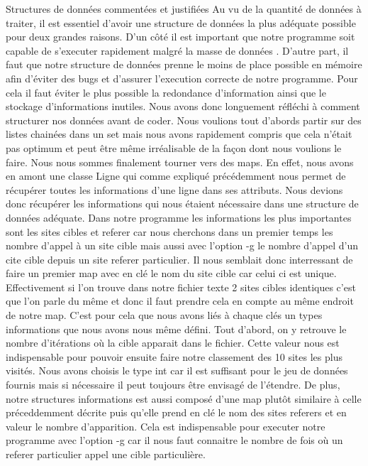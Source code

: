 \documentclass{article}
\begin{document}
\begin{section}{Structures de données commentées et justifiées}
Au vu de la quantité de données à traiter, il est essentiel d'avoir une structure de données la plus adéquate possible pour deux grandes raisons. D'un côté il est important que notre programme soit capable de s'executer rapidement malgré la masse de données . D'autre part, il faut que notre structure de données prenne le moins de place possible en mémoire afin d'éviter des bugs et d'assurer l'execution correcte de notre programme. Pour cela il faut éviter le plus possible la redondance d'information ainsi que le stockage d'informations inutiles.
Nous avons donc longuement réfléchi à comment structurer nos données avant de coder. Nous voulions tout d'abords partir sur des listes chainées dans un set mais nous avons rapidement compris que cela n'était pas optimum et peut être même irréalisable de la façon dont nous voulions le faire. Nous nous sommes finalement tourner vers des maps.
En effet, nous avons en amont une classe Ligne qui comme expliqué précédemment nous permet de récupérer toutes les informations d'une ligne dans ses attributs. Nous devions donc récupérer les informations qui nous étaient nécessaire dans une structure de données adéquate.
Dans notre programme les informations les plus importantes sont les sites cibles et referer car nous cherchons dans un premier temps les nombre d'appel à un site cible mais aussi avec l'option -g le nombre d'appel d'un cite cible depuis un site referer particulier. Il nous semblait donc interressant de faire un premier map avec en clé le nom du site cible car celui ci est unique. Effectivement si l'on trouve dans notre fichier texte 2 sites cibles identiques c'est que l'on parle du même et donc il faut prendre cela en compte au même endroit de notre map. C'est pour cela que nous avons liés à chaque clés un types informations que nous avons nous même défini. 
Tout d'abord, on y retrouve le nombre d'itérations où la cible apparait dans le fichier. Cette valeur nous est indispensable pour pouvoir ensuite faire notre classement des 10 sites les plus visités. Nous avons choisis le type int car il est suffisant pour le jeu de données fournis mais si nécessaire il peut toujours être envisagé de l'étendre.
De plus, notre structures informations est aussi composé d'une map plutôt similaire à celle préceddemment décrite puis qu'elle prend en clé le nom des sites referers et en valeur le nombre d'apparition. Cela est indispensable pour executer notre programme avec l'option -g car il nous faut connaitre le nombre de fois où un referer particulier appel une cible particulière.

\end{section}
\end{document}

